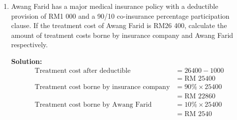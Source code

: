 \documentclass{report}
\newcommand{\sol}{

    \vspace{0.5em}\textbf{Solution:}\vspace{0.5em}}
\begin{document}
\begin{enumerate}
    \item Awang Farid has a major medical insurance policy with a deductible provision of
          RM1 000 and a 90/10 co-insurance percentage participation clause. If the
          treatment cost of Awang Farid is RM26 400, calculate the amount of treatment
          costs borne by insurance company and Awang Farid respectively. \sol{}
          \begin{align*}
              \text{Treatment cost after deductible}           & = 26 400 - 1 000      \\
                                                               & = \text{RM } 25 400   \\
              \text{Treatment cost borne by insurance company} & = 90 \% \times 25 400 \\
                                                               & = \text{RM } 22 860   \\
              \text{Treatment cost borne by Awang Farid}       & = 10 \% \times 25 400 \\
                                                               & = \text{RM } 2 540
          \end{align*}
\end{enumerate}
\end{document}
